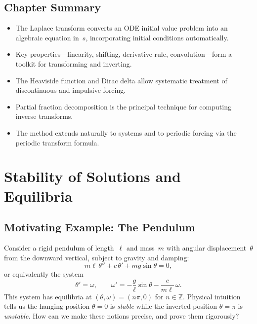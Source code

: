\documentclass[12pt,a4paper,openany]{book}
\theoremstyle{definition}
\theoremstyle{plain}
\theoremstyle{remark}
\newcommand{\Z}{\mathbb{Z}}
\begin{document}
\section{Chapter Summary}
\label{sec:laplace-summary}

\begin{itemize}
  \item The Laplace transform converts an ODE initial value problem into an
    algebraic equation in~\(s\), incorporating initial conditions automatically.
  \item Key properties---linearity, shifting, derivative rule, convolution---form
    a toolkit for transforming and inverting.
  \item The Heaviside function and Dirac delta allow systematic treatment of
    discontinuous and impulsive forcing.
  \item Partial fraction decomposition is the principal technique for computing
    inverse transforms.
  \item The method extends naturally to systems and to periodic forcing via
    the periodic transform formula.
\end{itemize}



\chapter{Stability of Solutions and Equilibria}
\label{ch:stability}

\section{Motivating Example: The Pendulum}
\label{sec:stability-motivation}

Consider a rigid pendulum of length~\(\ell\) and mass~\(m\)
with angular displacement~\(\theta\) from the downward vertical, subject to
gravity and damping:
\begin{equation}\label{eq:pendulum}
  m\ell\,\theta'' + c\,\theta' + mg\sin\theta = 0,
\end{equation}
or equivalently the system
\[
  \theta' = \omega, \qquad
  \omega' = -\frac{g}{\ell}\sin\theta - \frac{c}{m\ell}\,\omega.
\]
This system has equilibria at \((\theta,\omega)=(n\pi,0)\) for \(n\in\Z\).
Physical intuition tells us the hanging position \(\theta=0\) is
\emph{stable} while the inverted position \(\theta=\pi\) is \emph{unstable}.
How can we make these notions precise, and prove them rigorously?
\end{document}
